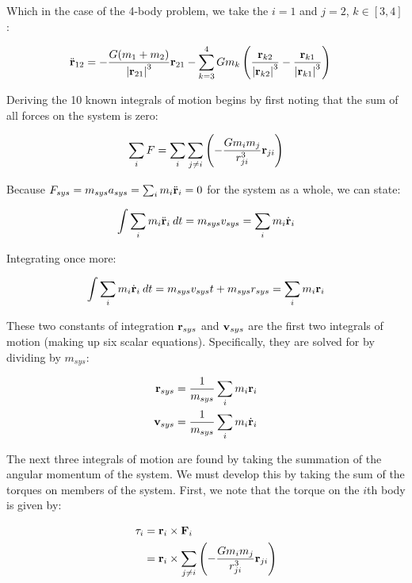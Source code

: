 Which in the case of the 4-body problem, we take the $i=1$ and $j=2$, $k \in [3,4]$:

\begin{align*}
    \ddot{\mathbf{r}}_{12} &= -\frac{G (m_1 + m_2)}{\left| \mathbf{r}_{21} \right|^3} \mathbf{r}_{21} - \sum_{k=3}^4 G m_k \left(\frac{\mathbf{r}_{k2}}{{\left| \mathbf{r}_{k2} \right|^3}} - \frac{\mathbf{r}_{k1}}{{\left| \mathbf{r}_{k1} \right|^3}}\right)
\end{align*}

Deriving the 10 known integrals of motion begins by first noting that the sum of all forces on the system is zero:

\begin{equation}
    \sum_i F = \sum_i \sum_{j \neq i} \left( -\frac{G m_i m_j}{r_{ji}^3} \mathbf{r}_{ji} \right)
\end{equation}

Because $F_{sys} = m_{sys} a_{sys} = \sum_i m_i \ddot{\mathbf{r}}_i = 0$ for the system as a whole, we can state:

\begin{equation}
    \int \sum_i m_i \ddot{\mathbf{r}}_i \: dt = m_{sys} v_{sys} = \sum_i m_i \dot{\mathbf{r}}_i
\end{equation}

Integrating once more:

\begin{equation}
    \int \sum_i m_i \dot{\mathbf{r}}_i \: dt = m_{sys} v_{sys} t + m_{sys} r_{sys}  = \sum_i m_i \mathbf{r}_i
\end{equation}

These two constants of integration $\mathbf{r}_{sys}$ and $\mathbf{v}_{sys}$ are the first two integrals of motion (making up six scalar equations). Specifically, they are solved for by dividing by $m_{sys}$:

\begin{align*}
    \mathbf{r}_{sys} &= \frac{1}{m_{sys}} \sum_i m_i \mathbf{r}_i \\
    \mathbf{v}_{sys} &= \frac{1}{m_{sys}} \sum_i m_i \dot{\mathbf{r}}_i \\
\end{align*}

The next three integrals of motion are found by taking the summation of the angular momentum of the system. We must develop this by taking the sum of the torques on members of the system. First, we note that the torque on the $i$th body is given by:

\begin{align*}
    \mathbf{\tau}_i &= \mathbf{r}_i \times \mathbf{F}_i \\
    &= \mathbf{r}_i \times \sum_{j \neq i} \left( -\frac{G m_i m_j}{r_{ji}^3} \mathbf{r}_{ji} \right) \\
\end{align*}

